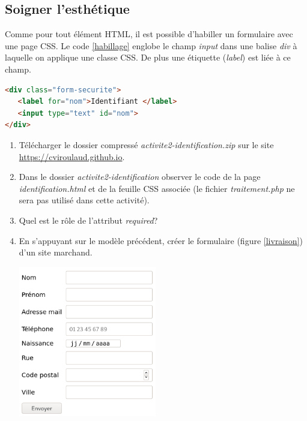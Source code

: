 \documentclass[a4paper,11pt]{article}
\begin{document}
\begin{Form}
\subsection{Soigner l'esthétique}
Comme pour tout élément HTML, il est possible d'habiller un formulaire avec une page CSS. Le code \ref{habillage} englobe le champ \emph{input} dans une balise \emph{div} à laquelle on applique une classe CSS. De plus une étiquette (\emph{label}) est liée à ce champ.
\begin{center}
\begin{lstlisting}[language=HTML]
<div class="form-securite">
   <label for="nom">Identifiant </label>
   <input type="text" id="nom">
</div>
\end{lstlisting}
\label{habillage}
\end{center}
\begin{activite}
\begin{enumerate}
\item Télécharger le dossier compressé \emph{activite2-identification.zip} sur le site \mbox{\url{https://cviroulaud.github.io}}.
\item Dans le dossier \emph{activite2-identification} observer le code de la page \emph{identification.html} et de la feuille CSS associée (le fichier \emph{traitement.php} ne sera pas utilisé dans cette activité).
\item Quel est le rôle de l'attribut \emph{required}?
\item En s'appuyant sur le modèle précédent, créer le formulaire (figure \ref{livraison}) d'un site marchand.
\begin{center}
\centering
\includegraphics[width=6cm]{ressources/livraison.png}
\label{livraison}
\end{center}
\end{enumerate}
\end{activite}

\end{Form}
\end{document}
